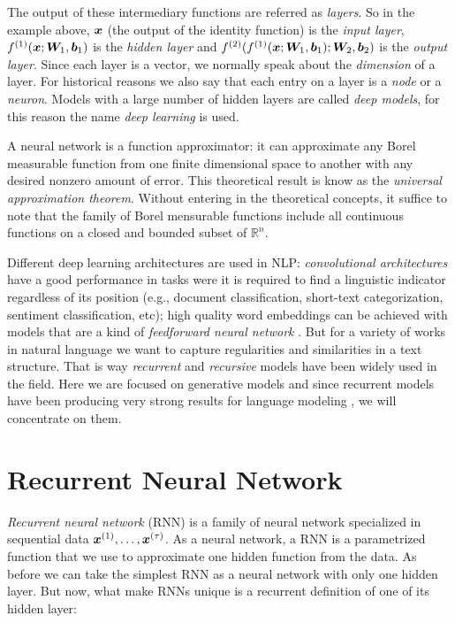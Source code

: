 The output of these intermediary functions are referred as \textit{layers}. So in the example above, $\bm{x}$ (the output of the identity function) is the \textit{input layer}, $f^{(1)}(\bm{x}; \bm{W}_1, \bm{b}_1)$ is the \textit{hidden layer} and $f^{(2)}(f^{(1)}(\bm{x}; \bm{W}_1, \bm{b}_1); \bm{W}_2, \bm{b}_2)$ is the \textit{output layer}. Since each layer is a vector, we normally speak about the \textit{dimension} of a layer. For historical reasons we also say that each entry on a layer is a \textit{node} or a \textit{neuron}.  Models with a large number of hidden layers are called \textit{deep models}, for this reason the name \textit{deep learning} is used.  

\par A neural network is a function approximator: it can approximate any Borel measurable function from one finite dimensional space to another with any desired nonzero amount of error. This theoretical result is know as the \textit{universal approximation theorem}\cite{Cybenko}. Without entering in the theoretical concepts, it suffice to note that the family of Borel mensurable functions include all continuous functions on a closed and bounded subset of $\mathbb{R}^n$.



Different deep learning architectures are used in NLP: \textit{convolutional architectures} have a good performance in tasks were it is required to find a linguistic indicator regardless of its position (e.g., document classification, short-text categorization, sentiment classification, etc); high quality word embeddings can be achieved with models that are a kind of \textit{feedforward neural network} \cite{Mikolov23}. But for a variety of works in natural language we want to capture regularities and similarities in a text structure. That is way \textit{recurrent} and \textit{recursive} models have been widely used in the field. Here we are focused on generative models and since recurrent models have been producing very strong results for language modeling \cite{goldberg15}, we will concentrate on them.

\section{Recurrent Neural Network}
\label{sec:RNN}


\textit{Recurrent neural network} (RNN) is a family of neural network specialized in sequential data $\bm{x}^{(1)}, \dots, \bm{x}^{(\tau)}$. As a neural network, a RNN is a parametrized function that we use to approximate one hidden function from the data. As before we can take the simplest RNN as a neural network with only one hidden layer. But now, what make RNNs unique is a recurrent definition of one of its hidden layer:

